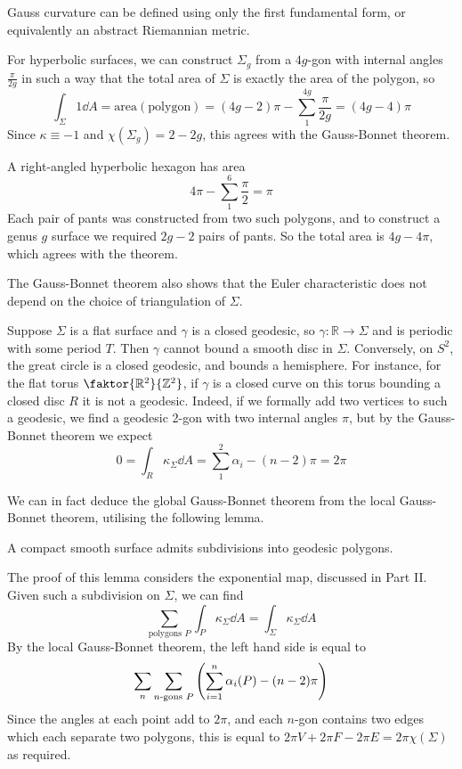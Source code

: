 \begin{remark}
	Gauss curvature can be defined using only the first fundamental form, or equivalently an abstract Riemannian metric.

	For hyperbolic surfaces, we can construct \( \Sigma_g \) from a \( 4g \)-gon with internal angles \( \frac{\pi}{2g} \) in such a way that the total area of \( \Sigma \) is exactly the area of the polygon, so
	\[
		\int_\Sigma 1 \dd{A} = \mathrm{area}(\mathrm{polygon}) = (4g-2)\pi - \sum_{1}^{4g} \frac{\pi}{2g} = (4g-4)\pi
	\]
	Since \( \kappa \equiv -1 \) and \( \chi(\Sigma_g) = 2-2g \), this agrees with the Gauss-Bonnet theorem.

	A right-angled hyperbolic hexagon has area
	\[
		4\pi - \sum_{1}^6 \frac{\pi}{2} = \pi
	\]
	Each pair of pants was constructed from two such polygons, and to construct a genus \( g \) surface we required \( 2g-2 \) pairs of pants.
	So the total area is \( 4g-4\pi \), which agrees with the theorem.

	The Gauss-Bonnet theorem also shows that the Euler characteristic does not depend on the choice of triangulation of \( \Sigma \).

	Suppose \( \Sigma \) is a flat surface and \( \gamma \) is a closed geodesic, so \( \gamma \colon \mathbb R \to \Sigma \) and is periodic with some period \( T \).
	Then \( \gamma \) cannot bound a smooth disc in \( \Sigma \).
	Conversely, on \( S^2 \), the great circle is a closed geodesic, and bounds a hemisphere.
	For instance, for the flat torus \( \faktor{\mathbb R^2}{\mathbb Z^2} \), if \( \gamma \) is a closed curve on this torus bounding a closed disc \( R \) it is not a geodesic.
	Indeed, if we formally add two vertices to such a geodesic, we find a geodesic 2-gon with two internal angles \( \pi \), but by the Gauss-Bonnet theorem we expect
	\[
		0 = \int_R \kappa_\Sigma \dd{A} = \sum_1^2 \alpha_i - (n-2)\pi = 2\pi
	\]
\end{remark}
We can in fact deduce the global Gauss-Bonnet theorem from the local Gauss-Bonnet theorem, utilising the following lemma.
\begin{lemma}
	A compact smooth surface admits subdivisions into geodesic polygons.
\end{lemma}
The proof of this lemma considers the exponential map, discussed in Part II.
Given such a subdivision on \( \Sigma \), we can find
\[
	\sum_{\text{polygons } P} \int_P \kappa_\Sigma \dd{A} = \int_\Sigma \kappa_\Sigma \dd{A}
\]
By the local Gauss-Bonnet theorem, the left hand side is equal to
\[
	\sum_n \sum_{n\text{-gons } P} \qty(\sum_{i=1}^n \alpha_i(P) - (n-2)\pi)
\]
Since the angles at each point add to \( 2\pi \), and each \( n \)-gon contains two edges which each separate two polygons, this is equal to \( 2\pi V + 2 \pi F - 2\pi E = 2\pi\chi(\Sigma) \) as required.

